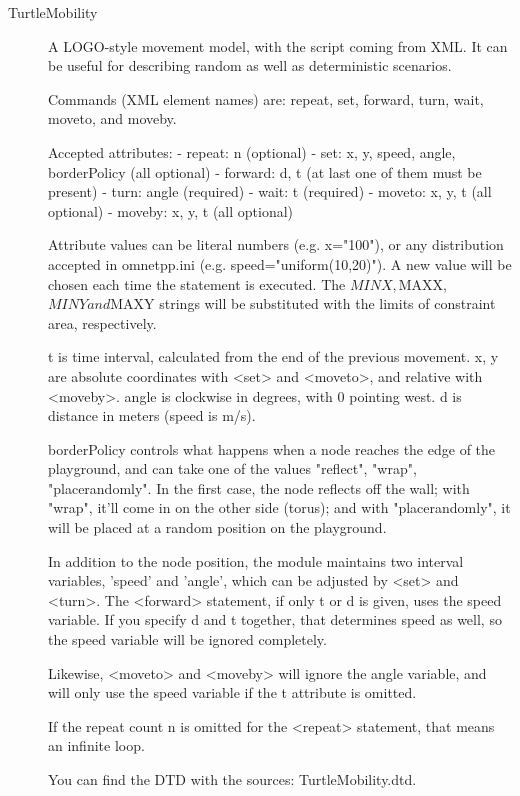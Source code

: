 \begin{description}
\item[TurtleMobility] A LOGO-style movement model, with the script coming
from XML. It can be useful for describing random as well as deterministic
scenarios.

Commands (XML element names) are: repeat, set, forward, turn, wait,
moveto, and moveby.

Accepted attributes:
   - repeat: n (optional)
   - set: x, y, speed, angle, borderPolicy (all optional)
   - forward: d, t (at last one of them must be present)
   - turn: angle (required)
   - wait: t (required)
   - moveto: x, y, t (all optional)
   - moveby: x, y, t (all optional)

Attribute values can be literal numbers (e.g. x="100"), or any
distribution accepted in omnetpp.ini (e.g. speed="uniform(10,20)").
A new value will be chosen each time the statement is executed.
The $MINX, $MAXX, $MINY and $MAXY strings will be substituted with the
limits of constraint area, respectively.

t is time interval, calculated from the end of the previous movement.
x, y are absolute coordinates with <set> and <moveto>, and relative
with <moveby>. angle is clockwise in degrees, with 0 pointing west.
d is distance in meters (speed is m/s).

borderPolicy controls what happens when a node reaches the edge of the
playground, and can take one of the values "reflect", "wrap",
"placerandomly". In the first case, the node reflects off the wall;
with "wrap", it'll come in on the other side (torus); and with
"placerandomly", it will be placed at a random position on the
playground.

In addition to the node position, the module maintains two interval variables,
'speed' and 'angle', which can be adjusted by <set> and <turn>.
The <forward> statement, if only t or d is given, uses the speed variable.
If you specify d and t together, that determines speed as well,
so the speed variable will be ignored completely.

Likewise, <moveto> and <moveby> will ignore the angle variable,
and will only use the speed variable if the t attribute is omitted.

If the repeat count n is omitted for the <repeat> statement, that
means an infinite loop.



You can find the DTD with the sources: TurtleMobility.dtd.



\end{description}

